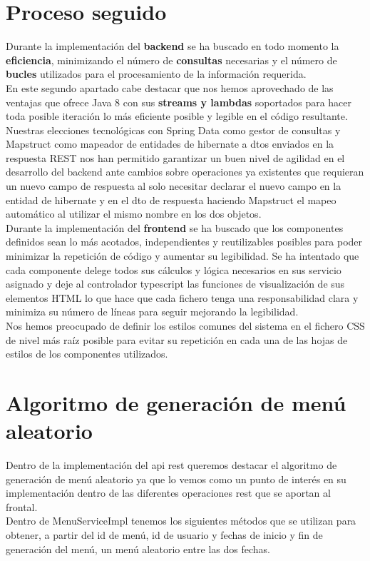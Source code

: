 \documentclass[12pt, a4paper, twoside]{book}
\begin{document}
	\section{Proceso seguido}
	Durante la implementación del \textbf{backend} se ha buscado en todo momento la \textbf{eficiencia}, minimizando el número de \textbf{consultas} necesarias y el número de \textbf{bucles} utilizados para el procesamiento de la información requerida.\\
	En este segundo apartado cabe destacar que nos hemos aprovechado de las ventajas que ofrece Java 8 con sus \textbf{streams y lambdas} soportados para hacer toda posible iteración lo más eficiente posible y legible en el código resultante.\\
	Nuestras elecciones tecnológicas con Spring Data como gestor de consultas y Mapstruct como mapeador de entidades de hibernate a dtos enviados en la respuesta REST nos han permitido garantizar un buen nivel de agilidad en el desarrollo del backend ante cambios sobre operaciones ya existentes que requieran un nuevo campo de respuesta al solo necesitar declarar el nuevo campo en la entidad de hibernate y en el dto de respuesta haciendo Mapstruct el mapeo automático al utilizar el mismo nombre en los dos objetos.\\
	Durante la implementación del \textbf{frontend} se ha buscado que los componentes definidos sean lo más acotados, independientes y reutilizables posibles para poder minimizar la repetición de código y aumentar su legibilidad. Se ha intentado que cada componente delege todos sus cálculos y lógica necesarios en sus servicio asignado y deje al controlador typescript las funciones de visualización de sus elementos HTML lo que hace que cada fichero tenga una responsabilidad clara y minimiza su número de líneas para seguir mejorando la legibilidad.\\
	Nos hemos preocupado de definir los estilos comunes del sistema en el fichero CSS de nivel más raíz posible para evitar su repetición en cada una de las hojas de estilos de los componentes utilizados.
	\section{Algoritmo de generación de menú aleatorio}
	Dentro de la implementación del api rest queremos destacar el algoritmo de generación de menú aleatorio ya que lo vemos como un punto de interés en su implementación dentro de las diferentes operaciones rest que se aportan al frontal.\\
	Dentro de MenuServiceImpl tenemos los siguientes métodos que se utilizan para obtener, a partir del id de menú, id de usuario y fechas de inicio y fin de generación del menú, un menú aleatorio entre las dos fechas.\\
	
\end{document}
